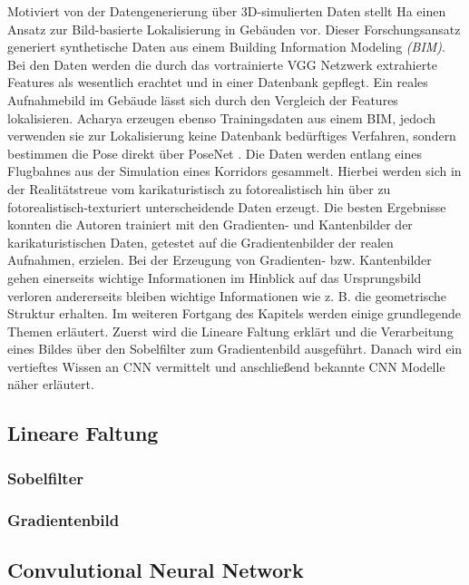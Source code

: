 Motiviert von der Datengenerierung über 3D-simulierten Daten stellt Ha \etal\cite{haImagebasedIndoorLocalization2018} einen Ansatz zur Bild-basierte Lokalisierung in Gebäuden vor. Dieser Forschungsansatz generiert synthetische Daten aus einem Building Information Modeling \textit{(BIM)}. Bei den Daten werden die durch das vortrainierte VGG Netzwerk \cite{simonyanVeryDeepConvolutional2014} extrahierte Features als wesentlich erachtet und in einer Datenbank gepflegt. Ein reales Aufnahmebild im Gebäude lässt sich durch den Vergleich der Features lokalisieren. Acharya \etal\cite{acharyaBIMPoseNetIndoorCamera2019, acharyaMODELLINGUNCERTAINTYSINGLE2019} erzeugen ebenso Trainingsdaten aus einem BIM, jedoch verwenden sie zur Lokalisierung keine Datenbank bedürftiges Verfahren, sondern bestimmen die Pose direkt über PoseNet \cite{kendallPoseNetConvolutionalNetwork2015}. Die Daten werden entlang eines Flugbahnes aus der Simulation eines Korridors gesammelt. Hierbei werden sich in der Realitätstreue vom karikaturistisch zu fotorealistisch hin über zu fotorealistisch-texturiert unterscheidende Daten erzeugt. Die besten Ergebnisse konnten die Autoren trainiert mit den Gradienten- und Kantenbilder der karikaturistischen Daten, getestet auf die Gradientenbilder der realen Aufnahmen, erzielen. Bei der Erzeugung von Gradienten- bzw. Kantenbilder gehen einerseits wichtige Informationen im Hinblick auf das Ursprungsbild verloren andererseits bleiben wichtige Informationen wie z. B. die geometrische Struktur erhalten.
\newline
\newline
Im weiteren Fortgang des Kapitels werden einige grundlegende Themen erläutert. Zuerst wird die Lineare Faltung erklärt und die Verarbeitung eines Bildes über den Sobelfilter zum Gradientenbild ausgeführt. Danach wird ein vertieftes Wissen an CNN vermittelt und anschließend bekannte CNN Modelle näher erläutert.

\subsection{Lineare Faltung}
\subsubsection{Sobelfilter}
\subsubsection{Gradientenbild}
\subsection{Convulutional Neural Network}
